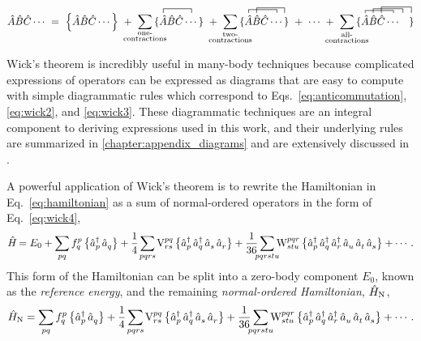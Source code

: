 \documentclass[thesis.tex]{subfiles}
\begin{document}
\begin{equation} \label{eq:wick4}
  \hat{A}\hat{B}\hat{C}\cdots\ =\ \normord{\hat{A}\hat{B}\hat{C}\cdots}\
  +\ \sum_{\mathclap{\substack{\text{one-} \\ \text{contractions}}}}
  \contraction[1.0ex]{\{ }{\hat{A}}{\hat{B}\hat{C}}{\cdots}
  \{ \hat{A}\hat{B}\hat{C}\cdots \}\
  +\ \sum_{\mathclap{\substack{\text{two-} \\ \text{contractions}}}}
  \contraction[0.8ex]{\{ }{\hat{A}}{\hat{B}\hat{C}}{\cdots}
  \contraction[1.2ex]{\{ \hat{A}}{\hat{B}}{\hat{C}\cdots}{}
  \{ \hat{A}\hat{B}\hat{C}\cdots \}\
  +\ \cdots\ +\ \sum_{\mathclap{\substack{\text{all-} \\ \text{contractions}}}}
  \contraction[0.6ex]{\{ }{\hat{A}}{\hat{B}\hat{C}}{\cdots}
  \contraction[1.0ex]{\{ \hat{A}}{\hat{B}}{\hat{C}\cdots}{\ }
  \contraction[1.4ex]{\{ \hat{A}\hat{B}}{\hat{C}}{\cdots\ \ \ }{}
  \{ \hat{A}\hat{B}\hat{C}\cdots\ \ \ \}
\end{equation}

Wick's theorem is incredibly useful in many-body techniques because complicated expressions of operators can be expressed as diagrams that are easy to compute with simple diagrammatic rules which correspond to Eqs.\ \eqref{eq:anticommutation},\eqref{eq:wick2}, and \eqref{eq:wick3}.  These diagrammatic techniques are an integral component to deriving expressions used in this work, and their underlying rules are summarized in \ref{chapter:appendix_diagrams} and are extensively discussed in \cite{SHAVITT2009}.

A powerful application of Wick's theorem is to rewrite the Hamiltonian in Eq.\ \eqref{eq:hamiltonian} as a sum of normal-ordered operators in the form of Eq.\ \eqref{eq:wick4},
\begin{equation} \label{eq:HamN}
  \Ham = E_{0} + \sum_{\mathclap{pq}}\fint{p}{q}\normord{\co{p}\ao{q}} + \frac{1}{4}\sum_{\mathclap{pqrs}}\vint{pq}{rs}\normord{\co{p}\co{q}\ao{s}\ao{r}} + \frac{1}{36}\sum_{\mathclap{pqrstu}}\wint{pqr}{stu}\normord{\co{p}\co{q}\co{r}\ao{u}\ao{t}\ao{s}} + \cdots.
\end{equation}
This form of the Hamiltonian can be split into a zero-body component $E_{0}$, known as the \textit{reference energy}, and the remaining \textit{normal-ordered Hamiltonian}, $\hat{H}_{\mathrm{N}}$,
\begin{equation} \label{eq:HamN1}
  \HamN = \sum_{\mathclap{pq}}\fint{p}{q}\normord{\co{p}\ao{q}} + \frac{1}{4}\sum_{\mathclap{pqrs}}\vint{pq}{rs}\normord{\co{p}\co{q}\ao{s}\ao{r}} + \frac{1}{36}\sum_{\mathclap{pqrstu}}\wint{pqr}{stu}\normord{\co{p}\co{q}\co{r}\ao{u}\ao{t}\ao{s}} + \cdots.
\end{equation}
\end{document}
